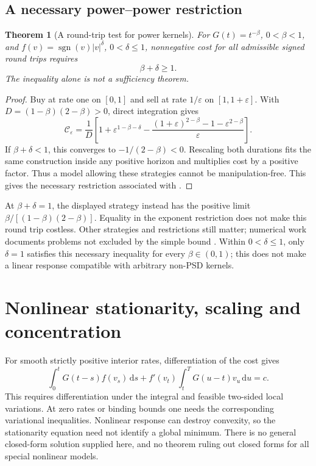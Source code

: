 \documentclass[11pt]{article}
\numberwithin{equation}{section}
\newtheorem{theorem}{Theorem}[section]
\theoremstyle{definition}
\theoremstyle{remark}
\theoremstyle{definition}
\newcommand{\dd}{\,\mathrm d}
\begin{document}
\subsection{A necessary power--power restriction}
\begin{theorem}[A round-trip test for power kernels]\label{thm:gatheral}
For $G(t)=t^{-\beta}$, $0<\beta<1$, and
$f(v)=\operatorname{sgn}(v)|v|^\delta$, $0<\delta\leq1$, nonnegative cost
for all admissible signed round trips requires
\begin{equation}\label{eq:gd}
 \beta+\delta\geq1.
\end{equation}
The inequality alone is not a sufficiency theorem.
\end{theorem}
\begin{proof}
Buy at rate one on $[0,1]$ and sell at rate $1/\varepsilon$ on
$[1,1+\varepsilon]$. With $D=(1-\beta)(2-\beta)>0$, direct integration gives
\begin{equation}\label{eq:powerroundtrip}
 \mathcal C_\varepsilon=\frac1D\left[
 1+\varepsilon^{1-\beta-\delta}
 -\frac{(1+\varepsilon)^{2-\beta}-1-\varepsilon^{2-\beta}}{\varepsilon}
 \right].
\end{equation}
If $\beta+\delta<1$, this converges to $-1/(2-\beta)<0$.
Rescaling both durations fits the same construction inside any positive horizon
and multiplies cost by a positive factor. Thus a model allowing these strategies
cannot be manipulation-free. This gives the necessary restriction associated
with \citet{gatheral2010}.
\end{proof}
At $\beta+\delta=1$, the displayed strategy instead has the positive limit
$\beta/[(1-\beta)(2-\beta)]$. Equality in the exponent restriction does
not make this round trip costless. Other strategies and restrictions still
matter; numerical work documents problems not excluded by the simple bound
\citep{curato2017}. Within $0<\delta\leq1$, only $\delta=1$ satisfies this
necessary inequality for every $\beta\in(0,1)$; this does not make a linear
response compatible with arbitrary non-PSD kernels.

\section{Nonlinear stationarity, scaling and concentration}\label{sec:obstruction}
For smooth strictly positive interior rates, differentiation of the cost gives
\begin{equation}\label{eq:nonlineq}
 \int_0^tG(t-s)f(v_s)\dd s+
 f'(v_t)\int_t^TG(u-t)v_u\dd u=c.
\end{equation}
This requires differentiation under the integral and feasible two-sided local
variations. At zero rates or binding bounds one needs the corresponding
variational inequalities. Nonlinear response can destroy convexity, so the
stationarity equation need not identify a global minimum. There is no general
closed-form solution supplied here, and no theorem ruling out closed forms for
all special nonlinear models.
\end{document}
